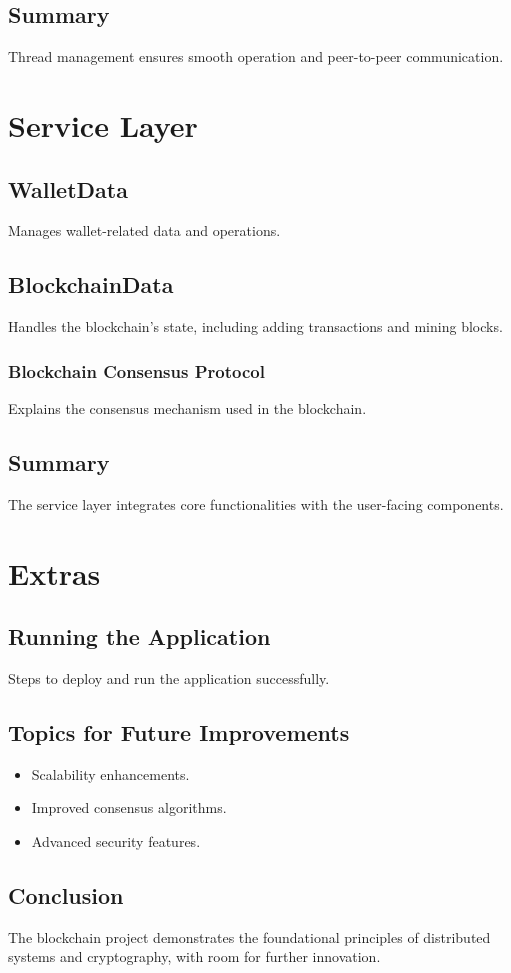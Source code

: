 \documentclass[12pt,a4paper]{report}
\begin{document}
\section{Summary}
Thread management ensures smooth operation and peer-to-peer communication.

\chapter{Service Layer}
\section{WalletData}
Manages wallet-related data and operations.
\section{BlockchainData}
Handles the blockchain's state, including adding transactions and mining blocks.
\subsection{Blockchain Consensus Protocol}
Explains the consensus mechanism used in the blockchain.
\section{Summary}
The service layer integrates core functionalities with the user-facing components.

\chapter{Extras}
\section{Running the Application}
Steps to deploy and run the application successfully.
\section{Topics for Future Improvements}
\begin{itemize}
    \item Scalability enhancements.
    \item Improved consensus algorithms.
    \item Advanced security features.
\end{itemize}
\section{Conclusion}
The blockchain project demonstrates the foundational principles of distributed systems and cryptography, with room for further innovation.
\end{document}
